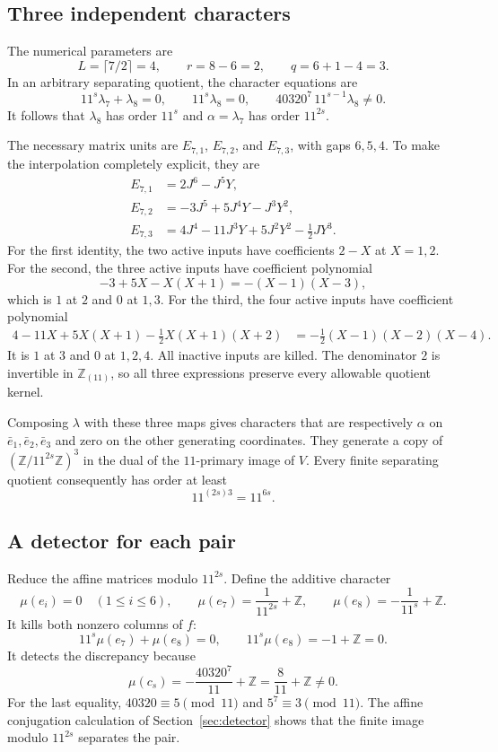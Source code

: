 \documentclass[11pt]{article}
\numberwithin{equation}{section}
\theoremstyle{definition}
\theoremstyle{remark}
\newcommand{\Z}{\mathbb Z}
\begin{document}
\subsection{Three independent characters}
The numerical parameters are
\[
L=\lceil7/2\rceil=4,\qquad r=8-6=2,\qquad q=6+1-4=3.
\]
In an arbitrary separating quotient, the character equations are
\[
11^s\lambda_7+\lambda_8=0,\qquad
11^s\lambda_8=0,\qquad
40320^7\,11^{s-1}\lambda_8\ne0.
\]
It follows that $\lambda_8$ has order $11^s$ and $\alpha=\lambda_7$ has order $11^{2s}$.

The necessary matrix units are $E_{7,1}$, $E_{7,2}$, and $E_{7,3}$, with gaps $6,5,4$. To make the interpolation completely explicit, they are
\begin{align}
E_{7,1}&=2J^6-J^5Y,\label{eq:instanceE1}\\
E_{7,2}&=-3J^5+5J^4Y-J^3Y^2,\label{eq:instanceE2}\\
E_{7,3}&=4J^4-11J^3Y+5J^2Y^2-\tfrac12JY^3.\label{eq:instanceE3}
\end{align}
For the first identity, the two active inputs have coefficients $2-X$ at $X=1,2$. For the second, the three active inputs have coefficient polynomial
\[
-3+5X-X(X+1)=-(X-1)(X-3),
\]
which is $1$ at $2$ and $0$ at $1,3$. For the third, the four active inputs have coefficient polynomial
\begin{align*}
4-11X+5X(X+1)-\tfrac12X(X+1)(X+2)
&=-\tfrac12(X-1)(X-2)(X-4).
\end{align*}
It is $1$ at $3$ and $0$ at $1,2,4$. All inactive inputs are killed. The denominator $2$ is invertible in $\Z_{(11)}$, so all three expressions preserve every allowable quotient kernel.

Composing $\lambda$ with these three maps gives characters that are respectively $\alpha$ on $\bar e_1,\bar e_2,\bar e_3$ and zero on the other generating coordinates. They generate a copy of $(\Z/11^{2s}\Z)^3$ in the dual of the $11$-primary image of $V$. Every finite separating quotient consequently has order at least
\begin{equation}\label{eq:instancedepth}
11^{(2s)3}=11^{6s}.
\end{equation}

\subsection{A detector for each pair}
Reduce the affine matrices modulo $11^{2s}$. Define the additive character
\[
\mu(e_i)=0\quad(1\le i\le6),\qquad
\mu(e_7)=\frac1{11^{2s}}+\Z,\qquad
\mu(e_8)=-\frac1{11^s}+\Z.
\]
It kills both nonzero columns of $f$:
\[
11^s\mu(e_7)+\mu(e_8)=0,\qquad 11^s\mu(e_8)=-1+\Z=0.
\]
It detects the discrepancy because
\[
\mu(c_s)=-\frac{40320^7}{11}+\Z=\frac8{11}+\Z\ne0.
\]
For the last equality, $40320\equiv5\pmod{11}$ and $5^7\equiv3\pmod{11}$. The affine conjugation calculation of Section~\ref{sec:detector} shows that the finite image modulo $11^{2s}$ separates the pair.
\end{document}
